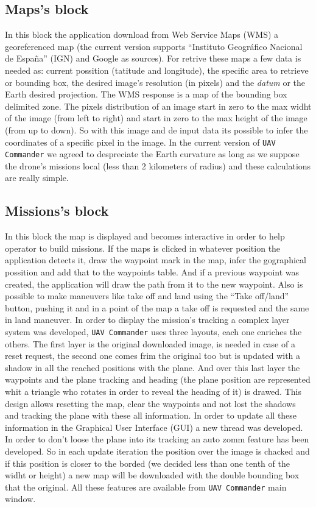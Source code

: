 \documentclass{llncs}
\begin{document}
\subsection{Maps's block}
\label{maps_block}

In this block the application download from Web Service Maps (WMS) a georeferenced map (the current version supports ``Instituto Geográfico Nacional de España'' (IGN) and Google as sources). For retrive these maps a few data is needed as: current possition (tatitude and longitude), the specific area to retrieve or bounding box, the desired image's resolution (in pixels) and the \textit{datum} or the Earth desired projection.
The WMS response is a map of the bounding box delimited zone. The pixels distribution of an image start in zero to the max widht of the image (from left to right) and start in zero to the max height of the image (from up to down). So with this image and de input data its possible to infer the coordinates of a specific pixel in the image.
In the current version of \texttt{UAV Commander} we agreed to despreciate the Earth curvature as long as we suppose the drone's missions local (less than 2 kilometers of radius) and these calculations are really simple.

\subsection{Missions's block}
\label{missions_block}

In this block the map is displayed and becomes interactive in order to help operator to build missions. If the maps is clicked in whatever position the application detects it, draw the waypoint mark in the map, infer the gographical possition and add that to the waypoints table. And if a previous waypoint was created, the application will draw the path from it to the new waypoint. Also is possible to make maneuvers like take off and land using the ``Take off/land'' button, pushing it and in a point of the map a take off is requested and the same in land maneuver.
In order to display the mission's tracking a complex layer system was developed, \texttt{UAV Commander} uses three layouts,  each one enriches the others. The first layer is the original downloaded image, is needed in case of a reset request, the second one comes frim the original too but is updated with a shadow in all the reached positions with the plane. And over this last layer the waypoints and the plane tracking and heading (the plane position are represented whit a triangle who rotates in order to reveal the heading of it) is drawed. This design allows resetting the map, clear the waypoints and not lost the shadows and tracking the plane with these all information.
In order to update all these information in the Graphical User Interface (GUI) a new thread was developed.
In order to don't loose the plane into its tracking an auto zomm feature has been developed. So in each update iteration the position over the image is chacked and if this position is closer to the borded (we decided less than one tenth of the widht or height) a new map will be downloaded with the double bounding box that the original.
All these features are available from \texttt{UAV Commander} main window.
\end{document}
